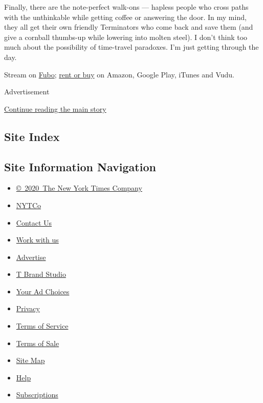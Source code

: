 Finally, there are the note-perfect walk-ons --- hapless people who
cross paths with the unthinkable while getting coffee or answering the
door. In my mind, they all get their own friendly Terminators who come
back and save them (and give a cornball thumbs-up while lowering into
molten steel). I don't think too much about the possibility of
time-travel paradoxes. I'm just getting through the day.

Stream on
\href{https://www.fubo.tv/lp/program/MV000336630000/?al=al1\%3Fv\%3D1\%26a\%3Dplay\%26t\%3Dprogram\%26pid\%3DMV000336630000\%26o\%3D0\&irmp=1206980\&irad=599309}{Fubo};
\href{https://www.justwatch.com/us/movie/terminator-2-judgment-day}{rent
or buy} on Amazon, Google Play, iTunes and Vudu.

Advertisement

\protect\hyperlink{after-bottom}{Continue reading the main story}

\hypertarget{site-index}{%
\subsection{Site Index}\label{site-index}}

\hypertarget{site-information-navigation}{%
\subsection{Site Information
Navigation}\label{site-information-navigation}}

\begin{itemize}
\tightlist
\item
  \href{https://help.nytimes.com/hc/en-us/articles/115014792127-Copyright-notice}{©~2020~The
  New York Times Company}
\end{itemize}

\begin{itemize}
\tightlist
\item
  \href{https://www.nytco.com/}{NYTCo}
\item
  \href{https://help.nytimes.com/hc/en-us/articles/115015385887-Contact-Us}{Contact
  Us}
\item
  \href{https://www.nytco.com/careers/}{Work with us}
\item
  \href{https://nytmediakit.com/}{Advertise}
\item
  \href{http://www.tbrandstudio.com/}{T Brand Studio}
\item
  \href{https://www.nytimes.com/privacy/cookie-policy\#how-do-i-manage-trackers}{Your
  Ad Choices}
\item
  \href{https://www.nytimes.com/privacy}{Privacy}
\item
  \href{https://help.nytimes.com/hc/en-us/articles/115014893428-Terms-of-service}{Terms
  of Service}
\item
  \href{https://help.nytimes.com/hc/en-us/articles/115014893968-Terms-of-sale}{Terms
  of Sale}
\item
  \href{https://spiderbites.nytimes.com}{Site Map}
\item
  \href{https://help.nytimes.com/hc/en-us}{Help}
\item
  \href{https://www.nytimes.com/subscription?campaignId=37WXW}{Subscriptions}
\end{itemize}
